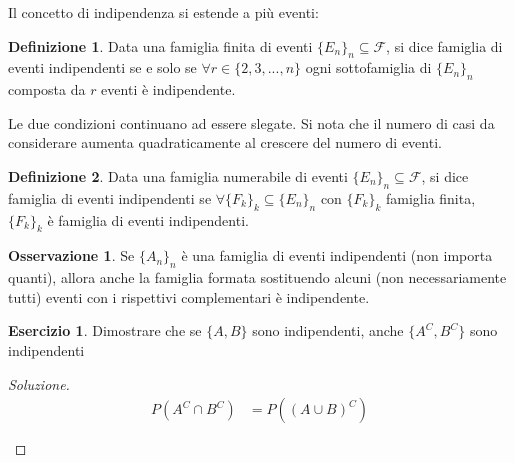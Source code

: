 \documentclass{article}
\theoremstyle{plain}
\theoremstyle{definition}
\newtheorem{definizione}{Definizione}[section]
\newtheorem{osservazione}{Osservazione}[section]
\newtheorem{esercizio}{Esercizio}[section]
\theoremstyle{remark}
\newenvironment{soluzione}
	{\renewcommand\qedsymbol{$\mathwitch*$}\begin{proof}[Soluzione]}
	{\end{proof}}
\renewcommand{\qedsymbol}{$\mathrightghost$}
\begin{document}
Il concetto di indipendenza si estende a più eventi:
\begin{definizione}
	Data una famiglia finita di eventi $\{E_n\}_n\subseteq\mathcal{F}$, si dice famiglia di eventi indipendenti se e solo se $\forall r\in \{2,3,...,n\}$ ogni sottofamiglia di $\{E_n\}_n$ composta da $r$ eventi è indipendente.
\end{definizione}
Le due condizioni continuano ad essere slegate. Si nota che il numero di casi da considerare aumenta quadraticamente al crescere del numero di eventi.
\begin{definizione}
	Data una famiglia numerabile di eventi $\{E_n\}_n\subseteq\mathcal{F}$, si dice famiglia di eventi indipendenti se $\forall \{F_k\}_k\subseteq\{E_n\}_n$ con $\{F_k\}_k$ famiglia finita, $\{F_k\}_k$ è famiglia di eventi indipendenti.
\end{definizione}
\begin{osservazione}
	Se $\{A_n\}_n$ è una famiglia di eventi indipendenti (non importa quanti), allora anche la famiglia formata sostituendo alcuni (non necessariamente tutti) eventi con i rispettivi complementari è indipendente.
\end{osservazione}
\begin{esercizio}
	Dimostrare che se $\{A,B\}$ sono indipendenti, anche $\{A^C,B^C\}$ sono indipendenti
	\begin{soluzione}
		\begin{align*}
			P(A^C\cap B^C)&=P((A\cup B)^C)\\
			&\\%
		\end{align*}
	\end{soluzione}
\end{esercizio}
\end{document}
